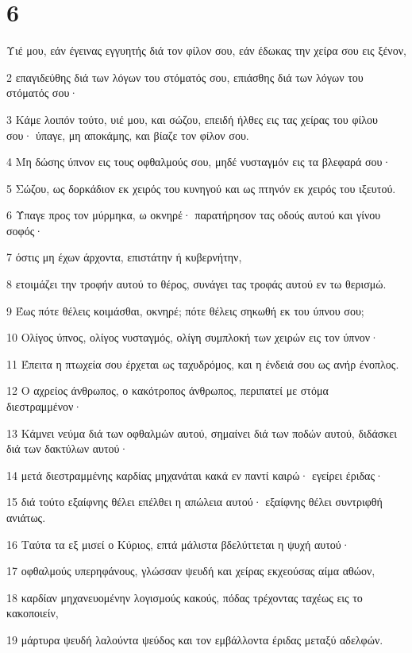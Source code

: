 \chapter{6}

\par Υιέ μου, εάν έγεινας εγγυητής διά τον φίλον σου, εάν έδωκας την χείρα σου εις ξένον,
\par 2 επαγιδεύθης διά των λόγων του στόματός σου, επιάσθης διά των λόγων του στόματός σου·
\par 3 Κάμε λοιπόν τούτο, υιέ μου, και σώζου, επειδή ήλθες εις τας χείρας του φίλου σου· ύπαγε, μη αποκάμης, και βίαζε τον φίλον σου.
\par 4 Μη δώσης ύπνον εις τους οφθαλμούς σου, μηδέ νυσταγμόν εις τα βλεφαρά σου·
\par 5 Σώζου, ως δορκάδιον εκ χειρός του κυνηγού και ως πτηνόν εκ χειρός του ιξευτού.
\par 6 Ύπαγε προς τον μύρμηκα, ω οκνηρέ· παρατήρησον τας οδούς αυτού και γίνου σοφός·
\par 7 όστις μη έχων άρχοντα, επιστάτην ή κυβερνήτην,
\par 8 ετοιμάζει την τροφήν αυτού το θέρος, συνάγει τας τροφάς αυτού εν τω θερισμώ.
\par 9 Έως πότε θέλεις κοιμάσθαι, οκνηρέ; πότε θέλεις σηκωθή εκ του ύπνου σου;
\par 10 Ολίγος ύπνος, ολίγος νυσταγμός, ολίγη συμπλοκή των χειρών εις τον ύπνον·
\par 11 Έπειτα η πτωχεία σου έρχεται ως ταχυδρόμος, και η ένδειά σου ως ανήρ ένοπλος.
\par 12 Ο αχρείος άνθρωπος, ο κακότροπος άνθρωπος, περιπατεί με στόμα διεστραμμένον·
\par 13 Κάμνει νεύμα διά των οφθαλμών αυτού, σημαίνει διά των ποδών αυτού, διδάσκει διά των δακτύλων αυτού·
\par 14 μετά διεστραμμένης καρδίας μηχανάται κακά εν παντί καιρώ· εγείρει έριδας·
\par 15 διά τούτο εξαίφνης θέλει επέλθει η απώλεια αυτού· εξαίφνης θέλει συντριφθή ανιάτως.
\par 16 Ταύτα τα εξ μισεί ο Κύριος, επτά μάλιστα βδελύττεται η ψυχή αυτού·
\par 17 οφθαλμούς υπερηφάνους, γλώσσαν ψευδή και χείρας εκχεούσας αίμα αθώον,
\par 18 καρδίαν μηχανευομένην λογισμούς κακούς, πόδας τρέχοντας ταχέως εις το κακοποιείν,
\par 19 μάρτυρα ψευδή λαλούντα ψεύδος και τον εμβάλλοντα έριδας μεταξύ αδελφών.
